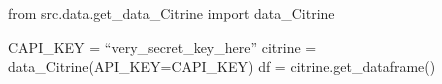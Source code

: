 from src.data.get_data_Citrine import data_Citrine

CAPI_KEY = ``very_secret_key_here''
citrine = data_Citrine(API_KEY=CAPI_KEY)
df = citrine.get_dataframe()
